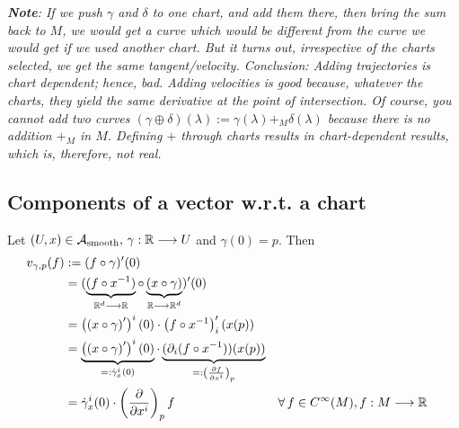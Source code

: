 \textit{\textbf{Note}: If we push $\gamma$ and $\delta$ to one chart, and add them there, then bring the sum back to $M$, we would get a curve which would be different from the curve we would get if we used another chart. But it turns out, irrespective of the charts selected, we get the same tangent/velocity. Conclusion: Adding trajectories is chart dependent; hence, bad. Adding velocities is good because, whatever the charts, they yield the same derivative at the point of intersection. Of course, you cannot add two curves $(\gamma \oplus \delta)(\lambda) := \gamma(\lambda) +_M \delta(\lambda)$ because there is no addition $+_M$ in $M$. Defining $+$ through charts results in chart-dependent results, which is, therefore, not real.}  

\subsection{Components of a vector w.r.t. a chart}

Let $(U,x) \in \A_{\text{smooth}}, \, \gamma : \R \to U$ and $\gamma(0) = p$. Then
\begin{align*}
  v_{\gamma,p}(f) & := (f \after \gamma)^\prime(0) \\
  & = (\underbrace{(f \after x^{-1})}_{\R^d \to \R} \after \underbrace{(x \after \gamma)}_{\R \to \R^d})^\prime(0) \\
  & = \displaystyle\left(\left(x \after \gamma\right)^\prime\right)^i(0) \cdot \left(f \after x^{-1}\right)^\prime_i(x(p)) \\
  & = \underbrace{\displaystyle\left(\left(x \after \gamma\right)^\prime\right)^i(0)}_{=: \dot{\gamma}_x^i(0)} \cdot \underbrace{(\partial_i(f \after x^{-1}))(x(p))}_{=: \left(\cibasis[f]{x^i}\right)_p} \\
  & = \dot{\gamma}_x^i(0) \cdot \left(\cibasis{x^i}\right)_p f && \forall \, f \in C^{\infty}(M), f : M \to \R
\end{align*}

